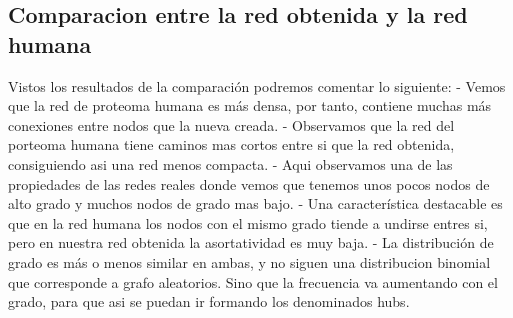 \subsection{Comparacion entre la red obtenida y la red humana}
Vistos los resultados de la comparación podremos comentar lo siguiente:
- Vemos que la red de proteoma humana es más densa, por tanto, contiene muchas más conexiones entre nodos que la nueva creada.
- Observamos que la red del porteoma humana tiene caminos mas cortos entre si que la red obtenida, consiguiendo asi una red menos compacta.
- Aqui observamos una de las propiedades de las redes reales donde vemos que tenemos unos pocos nodos de alto grado y muchos nodos de grado mas bajo. 
- Una característica destacable es que en la red humana los nodos con el mismo grado tiende a undirse entres si, pero en nuestra red obtenida la asortatividad es muy baja.
- La distribución de grado es más o menos similar en ambas, y no siguen una distribucion binomial que corresponde a grafo aleatorios. Sino que la frecuencia va aumentando con el grado, para que asi se puedan ir formando los denominados hubs.

